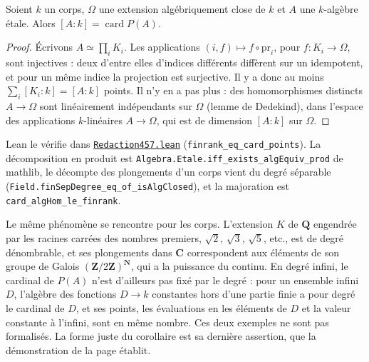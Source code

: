 \begin{encadre}
\begin{enonce}
Soient $k$ un corps, $\Omega$ une extension algébriquement close de $k$ et $A$ une $k$-algèbre étale. Alors $[A : k] = \operatorname{card} P(A)$.
\end{enonce}
\end{encadre}

\begin{proof}
Écrivons $A \simeq \prod_i K_i$. Les applications $(i, f) \mapsto f \circ \mathrm{pr}_i$, pour $f : K_i \to \Omega$, sont injectives : deux d'entre elles d'indices différents diffèrent sur un idempotent, et pour un même indice la projection est surjective. Il y a donc au moins $\sum_i [K_i : k] = [A : k]$ points. Il n'y en a pas plus : des homomorphismes distincts $A \to \Omega$ sont linéairement indépendants sur $\Omega$ (lemme de Dedekind), dans l'espace des applications $k$-linéaires $A \to \Omega$, qui est de dimension $[A : k]$ sur $\Omega$.
\end{proof}

\begin{sloppypar}
\noindent Lean le vérifie dans \href{\leanblobmain/Redaction457.lean}{\texttt{Redaction457.\allowbreak{}lean}} (\texttt{finrank\_eq\_card\_points}). La décomposition en produit est \texttt{Algebra.\allowbreak{}Etale.\allowbreak{}iff\_exists\_algEquiv\_prod} de mathlib, le décompte des plongements d'un corps vient du degré séparable (\texttt{Field.\allowbreak{}finSepDegree\_eq\_of\_isAlgClosed}), et la majoration est \texttt{card\_algHom\_le\_finrank}.
\end{sloppypar}

\begin{remarque}
Le même phénomène se rencontre pour les corps. L'extension $K$ de $\mathbf Q$ engendrée par les racines carrées des nombres premiers, $\sqrt 2$, $\sqrt 3$, $\sqrt 5$, etc., est de degré dénombrable, et ses plongements dans $\mathbf C$ correspondent aux éléments de son groupe de Galois $(\mathbf Z/2\mathbf Z)^{\mathbf N}$, qui a la puissance du continu. En degré infini, le cardinal de $P(A)$ n'est d'ailleurs pas fixé par le degré : pour un ensemble infini $D$, l'algèbre des fonctions $D \to k$ constantes hors d'une partie finie a pour degré le cardinal de $D$, et ses points, les évaluations en les éléments de $D$ et la valeur constante à l'infini, sont en même nombre. Ces deux exemples ne sont pas formalisés. La forme juste du corollaire est sa dernière assertion, que la démonstration de la page établit.
\end{remarque}
